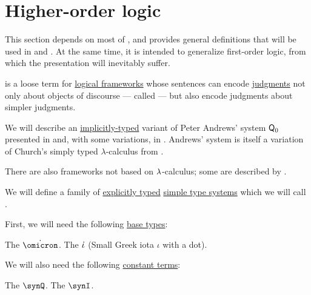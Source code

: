 \section{Higher-order logic}\label{sec:higher_order_logic}

This section depends on most of , and provides general definitions that will be used in  and . At the same time, it is intended to generalize first-order logic, from which the presentation will inevitably suffer.

\begin{concept}\label{con:higher_order_logic}
   is a loose term for \hyperref[def:logical_framework]{logical frameworks} whose sentences can encode \hyperref[con:judgment]{judgments} not only about objects of discourse --- called  --- but also encode judgments about simpler judgments.

  We will describe an \hyperref[con:explicit_and_implicit_typing]{implicitly-typed} variant of Peter Andrews' system \( \textsf{Q}_0 \) presented in \cite[\S 51]{Andrews2002Logic} and, with some variations, in . Andrews' system is itself a variation of Church's simply typed \( \lambda \)-calculus from \cite{Church1940STT}.

  There are also frameworks not based on \( \mathrm{\lambda} \)-calculus; some are described by .
\end{concept}

\begin{definition}\label{def:simply_typed_hol}\mimprovised
  We will define a family of \hyperref[def:lambda_term_typing_style]{explicitly typed} \hyperref[def:simple_type_system]{simple type systems} which we will call .

  First, we will need the following \hyperref[def:simple_type]{base types}:
  \begin{thmenum}[series=def:simple_type_system/base]
     The  \( \syn\omicron \).
     The  \( \dot{\iota} \) (Small Greek iota \( \iota \) with a dot).
  \end{thmenum}

  We will also need the following \hyperref[def:lambda_term]{constant terms}:
  \begin{thmenum}
     The  \( \synQ \).
     The  \( \synI \).
  \end{thmenum}
\end{definition}

\begin{definition}\label{def:nth_order_logic}
\end{definition}
